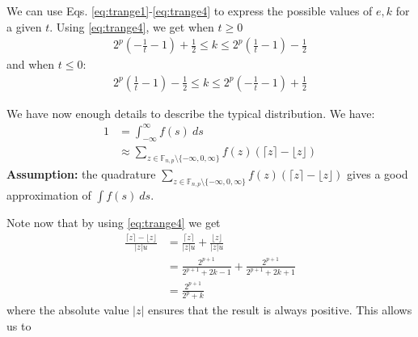 \documentclass[10pt,a4paper]{article}
\theoremstyle{plain}
\theoremstyle{definition}
\newcommand{\F}[1][n,p]{\mathbb{F}_{#1}}
\newcommand{\ceil}[1]{\lceil #1 \rceil}
\newcommand{\floor}[1]{\lfloor #1 \rfloor}
\newcommand{\absv}[1]{\vert #1\vert}
\begin{document}
We can use Eqs. \eqref{eq:trange1}-\eqref{eq:trange4} to express the possible values of $e,k$ for a given $t$. Using \eqref{eq:trange4}, we get when $t\geq 0$
\begin{align}
2^p\left(-\frac{1}{t}-1\right)+\frac{1}{2}\leq k\leq 2^p\left(\frac{1}{t}-1\right)-\frac{1}{2}
\end{align}
and when $t\leq 0$:
\begin{align}
2^p\left(\frac{1}{t}-1\right)-\frac{1}{2}\leq k\leq 2^p\left(-\frac{1}{t}-1\right)+\frac{1}{2}
\end{align}

We have now enough details to describe the typical distribution. We have:
\begin{align*}
1&=\int_{-\infty}^\infty f(s)~ds\\
&\approx \sum_{z\in\F\setminus\{-\infty,0,\infty\}} f(z)(\ceil{z}-\floor{z})
\end{align*}
\textbf{Assumption:} the quadrature $\sum_{z\in\F\setminus\{-\infty,0,\infty\}} f(z)(\ceil{z}-\floor{z})$ gives a good approximation of $\int f(s)~ds$.

Note now that by using \eqref{eq:trange4} we get 
\begin{align*}
\frac{\ceil{z}-\floor{z}}{\absv{z}u}&=\frac{\ceil{z}}{\absv{z}u}+\frac{\floor{z}}{\absv{z}u}\\
&=\frac{2^{p+1}}{2^{p+1}+2k-1}+ \frac{2^{p+1}}{2^{p+1}+2k+1}\\
&=\frac{2^{p+1}}{2^p+k}
\end{align*}
where the absolute value $\absv{z}$ ensures that the result is always positive. This allows us to 
\end{document}
